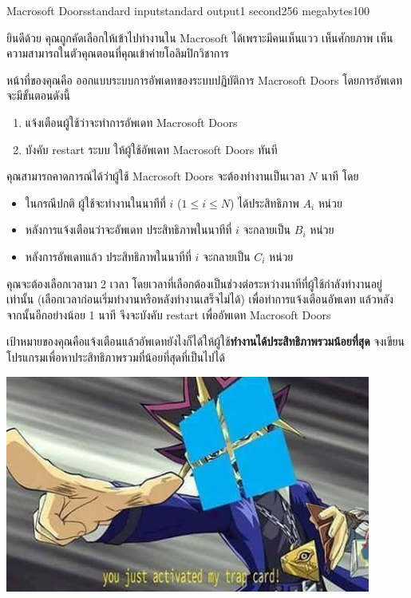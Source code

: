 \documentclass[11pt,a4paper]{article}
\begin{document}
\begin{problem}{Macrosoft Doors}{standard input}{standard output}{1 second}{256 megabytes}{100}

ยินดีด้วย คุณถูกคัดเลือกให้เข้าไปทำงานใน Macrosoft ได้เพราะมีคนเห็นแวว เห็นศักยภาพ เห็นความสามารถในตัวคุณตอนที่คุณเข้าค่ายโอลิมปิกวิชาการ

หน้าที่ของคุณคือ ออกแบบระบบการอัพเดทของระบบปฏิบัติการ Macrosoft Doors โดยการอัพเดทจะมีขั้นตอนดังนี้

\begin{enumerate}
\item แจ้งเตือนผู้ใช้ว่าจะทำการอัพเดท Macrosoft Doors
\item บังคับ restart ระบบ ให้ผู้ใช้อัพเดท Macrosoft Doors ทันที
\end{enumerate}

คุณสามารถคาดการณ์ได้ว่าผู้ใช้ Macrosoft Doors จะต้องทำงานเป็นเวลา $N$ นาที โดย
\begin{itemize}
\item ในกรณีปกติ ผู้ใช้จะทำงานในนาทีที่ $i$ ($1 \leq i \leq N$) ได้ประสิทธิภาพ $A_i$ หน่วย
\item หลังการแจ้งเตือนว่าจะอัพเดท ประสิทธิภาพในนาทีที่ $i$ จะกลายเป็น $B_i$ หน่วย
\item หลังการอัพเดทแล้ว ประสิทธิภาพในนาทีที่ $i$ จะกลายเป็น $C_i$ หน่วย
\end{itemize}

คุณจะต้องเลือกเวลามา 2 เวลา โดยเวลาที่เลือกต้องเป็นช่วงต่อระหว่างนาทีที่ผู้ใช้กำลังทำงานอยู่เท่านั้น (เลือกเวลาก่อนเริ่มทำงานหรือหลังทำงานเสร็จไม่ได้) เพื่อทำการแจ้งเตือนอัพเดท แล้วหลังจากนั้นอีกอย่างน้อย 1 นาที จึงจะบังคับ restart เพื่ออัพเดท Macrosoft Doors

เป้าหมายของคุณคือแจ้งเตือนแล้วอัพเดทยังไงก็ได้ให้ผู้ใช้\textbf{ทำงานได้ประสิทธิภาพรวมน้อยที่สุด} จงเขียนโปรแกรมเพื่อหาประสิทธิภาพรวมที่น้อยที่สุดที่เป็นไปได้

\begin{center}
\includegraphics[width=12cm]{trapcard.jpg}
\end{center}


\end{problem}
\end{document}
